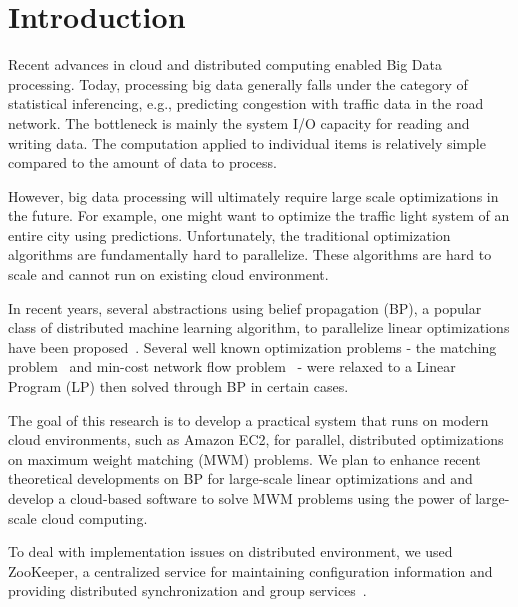 \section{Introduction}

Recent advances in cloud and distributed computing enabled Big Data 
processing. Today, processing big data generally falls under the category 
of statistical inferencing, e.g., predicting congestion with traffic data 
in the road network. The bottleneck is mainly the system I/O capacity for 
reading and writing data. The computation applied to individual items is 
relatively simple compared to the amount of data to process. 

However, big data processing will ultimately require large scale 
optimizations in the future. For example, one might want to optimize the 
traffic light system of an entire city using predictions. 
Unfortunately, the traditional optimization algorithms are fundamentally hard to parallelize. These algorithms are hard to scale and cannot run on existing cloud environment. 

In recent years, several abstractions using belief propagation (BP), a popular class of distributed machine learning algorithm, to 
parallelize linear optimizations have been proposed~\cite{BPLP, BPLPmatching}. 
Several well known optimization problems - the matching problem~\cite{BPmatching} and min-cost network flow problem~\cite{BPflow} - were relaxed to a Linear Program (LP) then solved through BP in certain cases. 

The goal of this research is to develop a practical system that runs on modern cloud environments, such as Amazon EC2, for parallel, distributed optimizations on maximum weight matching (MWM) problems. 
We plan to enhance recent theoretical developments on BP for large-scale linear optimizations and and develop a cloud-based software to solve MWM problems using the power of large-scale cloud computing.

To deal with implementation issues on distributed environment, we used ZooKeeper, a centralized service for maintaining configuration information and providing distributed synchronization and group services~\cite{ZooKeeper}.
